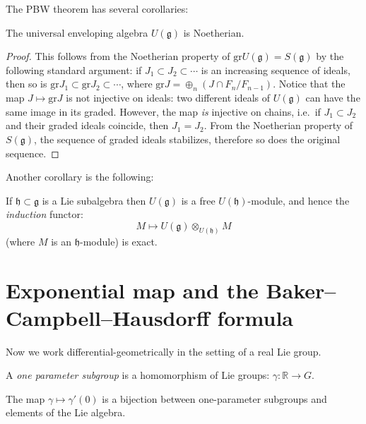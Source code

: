 The PBW theorem has several corollaries:

\begin{proposition}
\label{proposition-Ug-Noetherian}
The universal enveloping algebra $U(\mathfrak g)$ is Noetherian.
\end{proposition}

\begin{proof}
This follows from the Noetherian property of $\text{gr} U(\mathfrak g) = S(\mathfrak g)$ by the following standard argument: if $J_1\subset J_2 \subset \cdots $ is an increasing sequence of ideals, then so is $\text{gr} J_1\subset \text{gr} J_2 \subset \cdots$, where $\text{gr} J = \oplus_n (J\cap F_n/F_{n-1})$. Notice that the map $J\mapsto \text{gr} J$ is not injective on ideals: two different ideals of $U(\mathfrak g)$ can have the same image in its graded. However, the map \emph{is} injective on chains, i.e.\ if $J_1\subset J_2$ and their graded ideals coincide, then $J_1=J_2$. From the Noetherian property of $S(\mathfrak g)$, the sequence of graded ideals stabilizes, therefore so does the original sequence.
\end{proof}

Another corollary is the following:

\begin{proposition}
\label{proposition-induction-exact}
 If $\mathfrak h\subset\mathfrak g$ is a Lie subalgebra then $U(\mathfrak g)$ is a free $U(\mathfrak h)$-module, and hence the \emph{induction} functor:
$$ M\mapsto U(\mathfrak g)\otimes_{U(\mathfrak h)} M$$
(where $M$ is an $\mathfrak h$-module) is exact. 
\end{proposition}





\section{Exponential map and the Baker--Campbell--Hausdorff formula}
\label{section-exponentialmap}

Now we work differential-geometrically in the setting of a real Lie group. 

\begin{definition}
\label{definition-oneparameter-subgroup}
 A {\it one parameter subgroup} is a homomorphism of Lie groups: $\gamma:\mathbb R\to G$. 
\end{definition}


\begin{lemma}
\label{lemma-oneparameter}
 The map $\gamma\mapsto \gamma'(0)$ is a bijection between one-parameter subgroups and elements of the Lie algebra.
\end{lemma}

